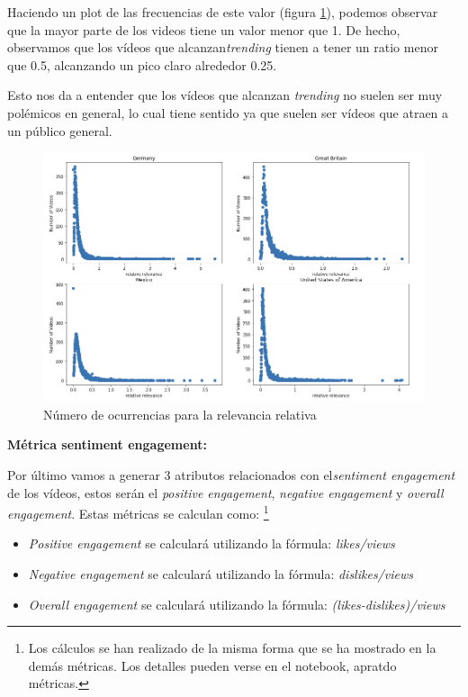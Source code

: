 \documentclass[a4paper,12pt]{article}
\begin{document}
Haciendo un plot de las frecuencias de este valor (figura \ref{fig:relfig}), podemos observar que la mayor parte de los videos tiene un valor menor que  1.  De hecho, observamos que los v\'ideos que alcanzan{\itshape trending} tienen a tener un ratio menor que 0.5, alcanzando un pico claro alrededor 0.25.

Esto nos da a entender que los v\'ideos que alcanzan {\itshape trending} no suelen ser muy pol\'emicos en general, lo cual tiene sentido ya que suelen ser v\'ideos que atraen a un p\'ublico general.

\begin{figure}[h!]
\centering
\includegraphics[width=14cm]{rel_relevance_plot.png}
\caption{N\'umero de ocurrencias para la relevancia relativa}
\label{fig:relfig}

\end{figure}

\textbf{M\'etrica sentiment engagement:}

Por \'ultimo vamos a generar 3 atributos relacionados con el{\itshape sentiment engagement} de los v\'ideos, estos ser\'an el {\itshape positive engagement}, {\itshape negative engagement} y {\itshape overall engagement}.
\newpage
Estas m\'etricas se calculan como: \footnote{Los c\'alculos se han realizado de la misma forma que se ha mostrado en la dem\'as m\'etricas. Los detalles pueden verse en el notebook, apratdo m\'etricas.}

\begin{itemize}
\item {\itshape Positive engagement} se calcular\'a utilizando la f\'ormula: {\itshape likes/views}


\item {\itshape Negative engagement} se calcular\'a utilizando la f\'ormula: {\itshape dislikes/views}



\item {\itshape Overall engagement} se calcular\'a utilizando la f\'ormula: {\itshape (likes-dislikes)/views}

\end{itemize}
\end{document}
